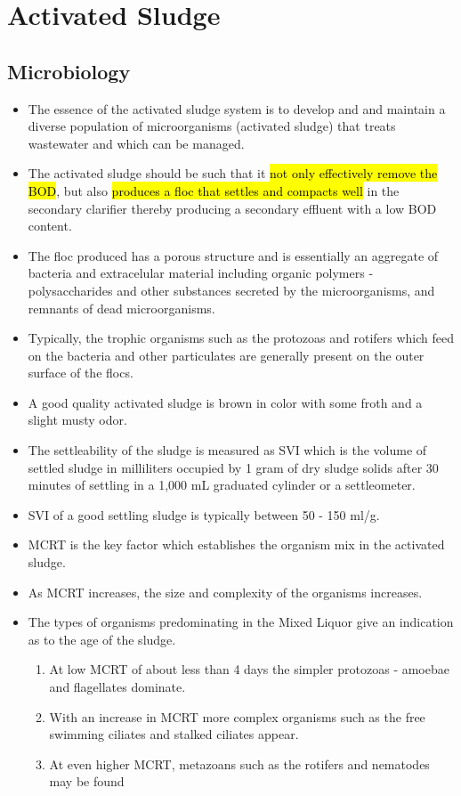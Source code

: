 \chapter{Activated Sludge}
		
		\section{Microbiology}		
\begin{itemize}
\item The essence of the activated sludge system is to develop and and maintain a diverse population of microorganisms (activated sludge) that treats wastewater and which can be managed.
\item The activated sludge should be such that it \hl{not only effectively remove the BOD}, but also \hl{produces a floc that settles and compacts well} in the secondary clarifier thereby producing a secondary effluent with a low BOD content.
\item The floc produced has a porous structure and is essentially an aggregate of bacteria and extracelular material including organic polymers - polysaccharides and other substances secreted by the microorganisms, and remnants of dead microorganisms.  
\item Typically, the trophic organisms such as the protozoas and rotifers which feed on the bacteria and other particulates are generally present on the outer surface of the flocs.
\item A good quality activated sludge is brown in color with some froth and a slight musty odor.  
\item The settleability of the sludge is measured as SVI which is the volume of settled sludge in milliliters occupied by 1 gram of dry sludge solids after 30 minutes of settling in a 1,000 mL graduated cylinder or a settleometer.  
\item SVI of a good settling sludge is typically between 50 - 150 ml/g.\\ 
\item MCRT is the key factor which establishes the organism mix in the activated sludge.  
\item As MCRT increases, the size and complexity of the organisms increases.  
\item The types of organisms predominating in the Mixed Liquor give an indication as to the age of the sludge.
\begin{enumerate}[1.]  
\item At low MCRT of about less than 4 days the simpler protozoas - amoebae and flagellates dominate. 
\item With an increase in MCRT more complex organisms such as the free swimming ciliates and stalked ciliates appear. 
\item At even higher MCRT, metazoans such as the rotifers and nematodes may be found
\end{enumerate}


\end{itemize}
